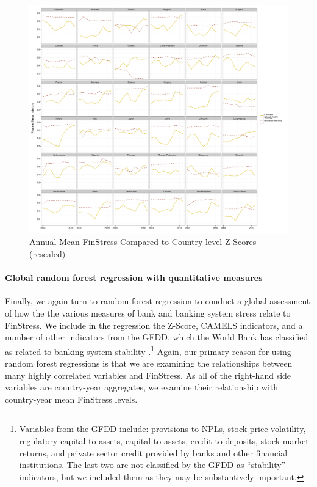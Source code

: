 \documentclass[]{article}
\begin{document}
\begin{figure}

    \caption{Annual Mean FinStress Compared to Country-level Z-Scores (rescaled)}
    \label{z_score}

    \begin{center}
        \includegraphics[scale=0.4]{figures/compare_to_z-score.pdf}
    \end{center}

\end{figure}

\paragraph{Global random forest regression with quantitative measures}

Finally, we again turn to random forest regression to conduct a global assessment of how the the various measures of bank and banking system stress relate to FinStress. We include in the regression the Z-Score, CAMELS indicators, and a number of other indicators from the GFDD, which the World Bank has classified as related to banking system stability \citep{worldbank2015}.\footnote{Variables from the GFDD include: provisions to NPLs, stock price volatility, regulatory capital to assets, capital to assets, credit to deposits, stock market returns, and private sector credit provided by banks and other financial institutions. The last two are not classified by the GFDD as ``stability'' indicators, but we included them as they may be substantively important.} Again, our primary reason for using random forest regressions is that we are examining the relationships between many highly correlated variables and FinStress. As all of the right-hand side variables are country-year aggregates, we examine their relationship with country-year mean FinStress levels.
\end{document}
